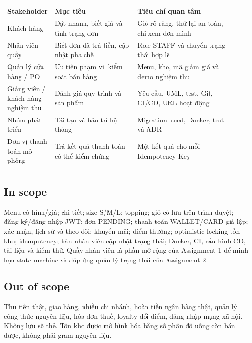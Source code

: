 \documentclass[a4paper,12pt,oneside]{report}
\begin{document}
\begingroup\fontsize{9}{11}\selectfont\setlength{\tabcolsep}{3pt}\renewcommand{\arraystretch}{1.35}
\begin{longtable}{@{}>{\raggedright\arraybackslash}p{0.14\linewidth} >{\raggedright\arraybackslash}p{0.36\linewidth} >{\raggedright\arraybackslash}p{0.44\linewidth}@{}}
\toprule
\textbf{Stakeholder} & \textbf{Mục tiêu} & \textbf{Tiêu chí quan tâm} \\
\midrule\endhead
Khách hàng & Đặt nhanh, biết giá và tình trạng đơn & Giỏ rõ ràng, thử lại an toàn, chỉ xem đơn mình \\
\addlinespace[2pt]
Nhân viên quầy & Biết đơn đã trả tiền, cập nhật pha chế & Role STAFF và chuyển trạng thái hợp lệ \\
\addlinespace[2pt]
Quản lý cửa hàng /\allowbreak{} PO & Ưu tiên phạm vi, kiểm soát bán hàng & Menu, kho, mã giảm giá và demo nghiệm thu \\
\addlinespace[2pt]
Giảng viên /\allowbreak{} khách hàng nghiệm thu & Đánh giá quy trình và sản phẩm & Yêu cầu, UML, test, Git, CI/\allowbreak{}CD, URL hoạt động \\
\addlinespace[2pt]
Nhóm phát triển & Tái tạo và bảo trì hệ thống & Migration, seed, Docker, test và ADR \\
\addlinespace[2pt]
Đơn vị thanh toán mô phỏng & Trả kết quả thanh toán có thể kiểm chứng & Một kết quả cho mỗi Idempotency-Key \\
\addlinespace[2pt]
\bottomrule\end{longtable}\endgroup

\subsection{In scope}
Menu có hình/\allowbreak{}giá; chi tiết; size S/\allowbreak{}M/\allowbreak{}L; topping; giỏ có lưu trên trình duyệt; đăng ký/\allowbreak{}đăng nhập JWT; đơn PENDING; thanh toán WALLET/\allowbreak{}CARD giả lập; xác nhận, lịch sử và theo dõi; khuyến mãi; điểm thưởng; optimistic locking tồn kho; idempotency; bàn nhân viên cập nhật trạng thái; Docker, CI, cấu hình CD, tài liệu và kiểm thử. Quầy nhân viên là phần mở rộng của Assignment 1 để minh họa state machine và đáp ứng quản lý trạng thái của Assignment 2.


\subsection{Out of scope}
Thu tiền thật, giao hàng, nhiều chi nhánh, hoàn tiền ngân hàng thật, quản lý công thức nguyên liệu, hóa đơn thuế, loyalty đổi điểm, đăng nhập mạng xã hội. Không lưu số thẻ. Tồn kho được mô hình hóa bằng số phần đồ uống còn bán được, không phải gram nguyên liệu.
\end{document}
